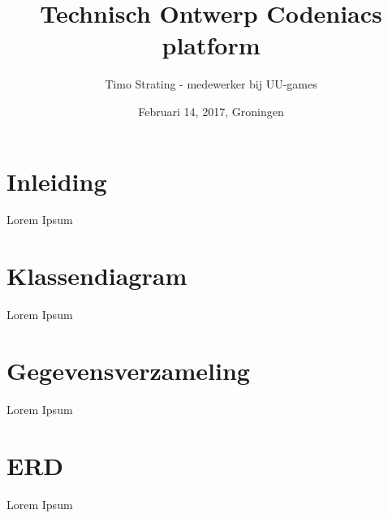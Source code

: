\documentclass[]{report}
\title{Technisch Ontwerp Codeniacs platform}
\author{Timo Strating - medewerker bij UU-games}
\date{Februari 14, 2017, Groningen}
\begin{document}
\maketitle

\tableofcontents
\newpage






\chapter{Inleiding}

Lorem Ipsum




\chapter{Klassendiagram}

Lorem Ipsum




\chapter{Gegevensverzameling}

Lorem Ipsum




\chapter{ERD}

Lorem Ipsum
\end{document}

